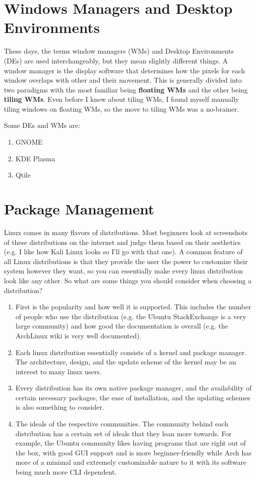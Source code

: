 \documentclass{article}
\begin{document}
\section{Windows Managers and Desktop Environments}

  These days, the terms window managers (WMs) and Desktop Environments (DEs) are used interchangeably, but they mean slightly different things. A window manager is the display software that determines how the pixels for each window overlaps with other and their movement. This is generally divided into two paradigms with the most familiar being \textbf{floating WMs} and the other being \textbf{tiling WMs}. Even before I knew about tiling WMs, I found myself manually tiling windows on floating WMs, so the move to tiling WMs was a no-brainer. 
  
  Some DEs and WMs are: 
  \begin{enumerate}
    \item GNOME 
    \item KDE Plasma
    \item Qtile
  \end{enumerate}

\section{Package Management}
  
  Linux comes in many flavors of distributions. Most beginners look at screenshots of these distributions on the internet and judge them based on their aesthetics (e.g. I like how Kali Linux looks so I'll go with that one). A common feature of all Linux distributions is that they provide the user the power to customize their system however they want, so you can essentially make every linux distribution look like any other. So what are some things you should consider when choosing a distribution? 

  \begin{enumerate}
    \item First is the popularity and how well it is supported. This includes the number of people who use the distribution (e.g. the Ubuntu StackExchange is a very large community) and how good the documentation is overall (e.g. the ArchLinux wiki is very well documented). 
    \item Each linux distribution essentially consists of a kernel and package manager. The architecture, design, and the update scheme of the kernel may be an interest to many linux users.  
    \item Every distribution has its own native package manager, and the availability of certain necessary packages, the ease of installation, and the updating schemes is also something to consider.  
    \item The ideals of the respective communities. The community behind each distribution has a certain set of ideals that they lean more towards. For example, the Ubuntu community likes having programs that are right out of the box, with good GUI support and is more beginner-friendly while Arch has more of a minimal and extremely customizable nature to it with its software being much more CLI dependent. 
  \end{enumerate}
\end{document}
